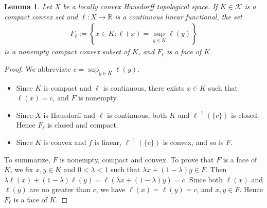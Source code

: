 \documentclass{article}
\numberwithin{equation}{section}
\newcommand{\bbR}{\mathbb{R}}
\newcommand{\scr}{\mathscr}
\theoremstyle{plain}
\newtheorem{lemma}[theorem]{Lemma}
\theoremstyle{definition}
\begin{document}
\begin{lemma}\label{kmlemma3}
Let $X$ be a locally convex Hausdorff topological space. If $K\in\scr{K}$ is a compact convex set and $\ell:X\to\bbR$ is a continuous linear functional, the set
\begin{align*}
	F_\ell:=\left\{x\in K:\ell(x)=\sup_{y\in K}\ell(y)\right\}
\end{align*}
is a nonempty compact convex subset of $K$, and $F_\ell$ is a face of $K$.
\end{lemma}
\begin{proof}
We abbreviate $c=\sup_{y\in K} \ell(y)$. 
\begin{itemize}
	\item Since $K$ is compact and $\ell$ is continuous, there exists $x\in K$ such that $\ell(x)=c$, and $F$ is nonempty. 
	\item Since $X$ is Hausdorff and $\ell$ is continuous, both $K$ and $\ell^{-1}(\{c\})$ is closed. Hence $F_\ell$ is closed and compact.
	\item Since $K$ is convex and $f$ is linear, $\ell^{-1}(\{c\})$ is convex, and so is $F$.
\end{itemize}
To summarize, $F$ is nonempty, compact and convex. To prove that $F$ is a face of $K$, we fix $x,y\in K$ and $0<\lambda<1$ such that $\lambda x+(1-\lambda)y\in F$. Then $\lambda \ell(x)+(1-\lambda)\ell(y)=\ell(\lambda x+(1-\lambda)y)=c$. Since both $\ell(x)$ and $\ell(y)$ are no greater than $c$, we have $\ell(x)=\ell(y)=c$, and $x,y\in F$. Hence $F_\ell$ is a face of $K$.
\end{proof}
\end{document}

